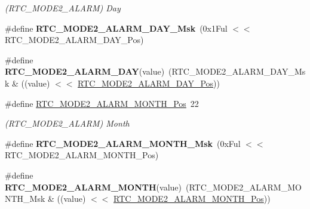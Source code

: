 \begin{DoxyCompactItemize}
\begin{DoxyCompactList}\small\item\em (R\+T\+C\+\_\+\+M\+O\+D\+E2\+\_\+\+A\+L\+A\+R\+M) Day \end{DoxyCompactList}\item 
\hypertarget{group___s_a_m_l21___r_t_c_ga9121adc87a2d35116a91f526e9ad5c94}{}\#define {\bfseries R\+T\+C\+\_\+\+M\+O\+D\+E2\+\_\+\+A\+L\+A\+R\+M\+\_\+\+D\+A\+Y\+\_\+\+Msk}~(0x1\+Ful $<$$<$ R\+T\+C\+\_\+\+M\+O\+D\+E2\+\_\+\+A\+L\+A\+R\+M\+\_\+\+D\+A\+Y\+\_\+\+Pos)\label{group___s_a_m_l21___r_t_c_ga9121adc87a2d35116a91f526e9ad5c94}

\item 
\hypertarget{group___s_a_m_l21___r_t_c_ga49b6b92dc714c6b6e9e1a4e31e77f1c5}{}\#define {\bfseries R\+T\+C\+\_\+\+M\+O\+D\+E2\+\_\+\+A\+L\+A\+R\+M\+\_\+\+D\+A\+Y}(value)~(R\+T\+C\+\_\+\+M\+O\+D\+E2\+\_\+\+A\+L\+A\+R\+M\+\_\+\+D\+A\+Y\+\_\+\+Msk \& ((value) $<$$<$ \hyperlink{group___s_a_m_l21___r_t_c_ga0a5e12490a836e5377314c4462de993c}{R\+T\+C\+\_\+\+M\+O\+D\+E2\+\_\+\+A\+L\+A\+R\+M\+\_\+\+D\+A\+Y\+\_\+\+Pos}))\label{group___s_a_m_l21___r_t_c_ga49b6b92dc714c6b6e9e1a4e31e77f1c5}

\item 
\hypertarget{group___s_a_m_l21___r_t_c_gaa3427280aaec7c00aba237482ac97495}{}\#define \hyperlink{group___s_a_m_l21___r_t_c_gaa3427280aaec7c00aba237482ac97495}{R\+T\+C\+\_\+\+M\+O\+D\+E2\+\_\+\+A\+L\+A\+R\+M\+\_\+\+M\+O\+N\+T\+H\+\_\+\+Pos}~22\label{group___s_a_m_l21___r_t_c_gaa3427280aaec7c00aba237482ac97495}

\begin{DoxyCompactList}\small\item\em (R\+T\+C\+\_\+\+M\+O\+D\+E2\+\_\+\+A\+L\+A\+R\+M) Month \end{DoxyCompactList}\item 
\hypertarget{group___s_a_m_l21___r_t_c_gaa2c5e29f9e0426b04bb859b75a493f29}{}\#define {\bfseries R\+T\+C\+\_\+\+M\+O\+D\+E2\+\_\+\+A\+L\+A\+R\+M\+\_\+\+M\+O\+N\+T\+H\+\_\+\+Msk}~(0x\+Ful $<$$<$ R\+T\+C\+\_\+\+M\+O\+D\+E2\+\_\+\+A\+L\+A\+R\+M\+\_\+\+M\+O\+N\+T\+H\+\_\+\+Pos)\label{group___s_a_m_l21___r_t_c_gaa2c5e29f9e0426b04bb859b75a493f29}

\item 
\hypertarget{group___s_a_m_l21___r_t_c_ga88447a269290df4630e44396634d2cfd}{}\#define {\bfseries R\+T\+C\+\_\+\+M\+O\+D\+E2\+\_\+\+A\+L\+A\+R\+M\+\_\+\+M\+O\+N\+T\+H}(value)~(R\+T\+C\+\_\+\+M\+O\+D\+E2\+\_\+\+A\+L\+A\+R\+M\+\_\+\+M\+O\+N\+T\+H\+\_\+\+Msk \& ((value) $<$$<$ \hyperlink{group___s_a_m_l21___r_t_c_gaa3427280aaec7c00aba237482ac97495}{R\+T\+C\+\_\+\+M\+O\+D\+E2\+\_\+\+A\+L\+A\+R\+M\+\_\+\+M\+O\+N\+T\+H\+\_\+\+Pos}))\label{group___s_a_m_l21___r_t_c_ga88447a269290df4630e44396634d2cfd}


\end{DoxyCompactItemize}
